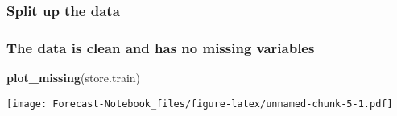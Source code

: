 \documentclass[]{article}
\newenvironment{Shaded}{\begin{snugshade}}{\end{snugshade}}
\newcommand{\KeywordTok}[1]{\textcolor[rgb]{0.13,0.29,0.53}{\textbf{#1}}}
\newcommand{\NormalTok}[1]{#1}
\newcommand{\OperatorTok}[1]{\textcolor[rgb]{0.81,0.36,0.00}{\textbf{#1}}}
\newcommand{\StringTok}[1]{\textcolor[rgb]{0.31,0.60,0.02}{#1}}
\begin{document}
\begin{Shaded}
\end{Shaded}

\hypertarget{split-up-the-data}{%
\subsubsection{Split up the data}\label{split-up-the-data}}

\begin{Shaded}
\end{Shaded}

\hypertarget{the-data-is-clean-and-has-no-missing-variables}{%
\subsubsection{The data is clean and has no missing
variables}\label{the-data-is-clean-and-has-no-missing-variables}}

\begin{Shaded}
\begin{Highlighting}[]
\KeywordTok{plot_missing}\NormalTok{(store.train)}
\end{Highlighting}
\end{Shaded}

\texttt{[image: Forecast-Notebook\_files/figure-latex/unnamed-chunk-5-1.pdf]}
\end{document}
